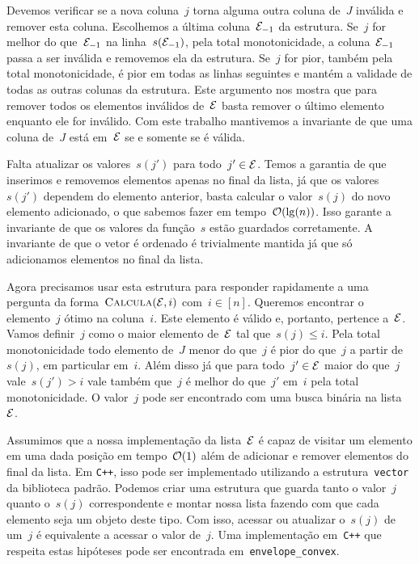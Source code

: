 Devemos verificar se a nova coluna~$j$ torna alguma outra coluna de~$J$ inválida e remover esta coluna. Escolhemos a última coluna~$\mathcal{E}_{-1}$ da estrutura. Se~$j$ for melhor do que~$\mathcal{E}_{-1}$ na linha~$s(\mathcal{E}_{-1})$, pela total monotonicidade, a coluna~$\mathcal{E}_{-1}$ passa a ser inválida e removemos ela da estrutura. Se~$j$ for pior, também pela total monotonicidade, é pior em todas as linhas seguintes e mantém a validade de todas as outras colunas da estrutura. Este argumento nos mostra que para remover todos os elementos inválidos de~$\mathcal{E}$ basta remover o último elemento enquanto ele for inválido. Com este trabalho mantivemos a invariante de que uma coluna de~$J$ está em~$\mathcal{E}$ se e somente se é válida.

Falta atualizar os valores~$s(j')$ para todo~$j' \in \mathcal{E}$. Temos a garantia de que inserimos e removemos elementos apenas no final da lista, já que os valores~$s(j')$ dependem do elemento anterior, basta calcular o valor~$s(j)$ do novo elemento adicionado, o que sabemos fazer em tempo~$\mathcal{O}(\lg(n))$. Isso garante a invariante de que os valores da função~$s$ estão guardados corretamente. A invariante de que o vetor é ordenado é trivialmente mantida já que só adicionamos elementos no final da lista.

Agora precisamos usar esta estrutura para responder rapidamente a uma pergunta da forma~${ \textsc{Calcula}(\mathcal{E},i) }$ com~$i \in [n]$. Queremos encontrar o elemento~$j$ ótimo na coluna~$i$. Este elemento é válido e, portanto, pertence a~$\mathcal{E}$. Vamos definir~$j$ como o maior elemento de~$\mathcal{E}$ tal que~$s(j) \leq i$. Pela total monotonicidade todo elemento de~$J$ menor do que~$j$ é pior do que~$j$ a partir de~$s(j)$, em particular em~$i$. Além disso já que para todo~$j' \in \mathcal{E}$ maior do que~$j$ vale~$s(j') > i$ vale também que~$j$ é melhor do que~$j'$ em~$i$ pela total monotonicidade. O valor~$j$ pode ser encontrado com uma busca binária na lista~$\mathcal{E}$.

Assumimos que a nossa implementação da lista~$\mathcal{E}$ é capaz de visitar um elemento em uma dada posição em tempo~$\mathcal{O}(1)$ além de adicionar e remover elementos do final da lista. Em \texttt{C++}, isso pode ser implementado utilizando a estrutura~\texttt{vector} da biblioteca padrão. Podemos criar uma estrutura que guarda tanto o valor~$j$ quanto o~$s(j)$ correspondente e montar nossa lista fazendo com que cada elemento seja um objeto deste tipo. Com isso, acessar ou atualizar o~$s(j)$ de um~$j$ é equivalente a acessar o valor de~$j$. Uma implementação em~\texttt{C++} que respeita estas hipóteses pode ser encontrada em~\texttt{envelope\_convex}.

